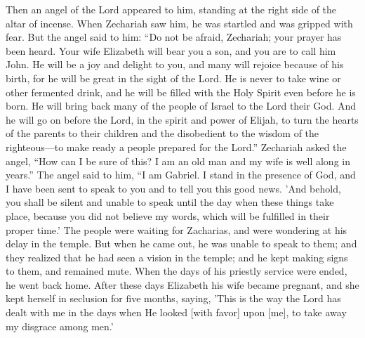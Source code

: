 \begin{scripture}[Luke 1:11-25]
    Then an angel of the Lord appeared to him, standing at the right side of the altar of incense.
    When Zechariah saw him, he was startled and was gripped with fear. 
    But the angel said to him: “Do not be afraid, Zechariah; your prayer has been heard. Your wife Elizabeth will bear you a son, and you are to call him John. 
    He will be a joy and delight to you, and many will rejoice because of his birth, 
    for he will be great in the sight of the Lord. He is never to take wine or other fermented drink, and he will be filled with the Holy Spirit even before he is born. 
    He will bring back many of the people of Israel to the Lord their God. 
    And he will go on before the Lord, in the spirit and power of Elijah, to turn the hearts of the parents to their children and the disobedient to the wisdom of the righteous—to make ready a people prepared for the Lord.”
    Zechariah asked the angel, “How can I be sure of this? I am an old man and my wife is well along in years.”
    The angel said to him, “I am Gabriel. I stand in the presence of God, and I have been sent to speak to you and to tell you this good news. 
    'And behold, you shall be silent and unable to speak until the day when these things take place, because you did not believe my words, which will be fulfilled in their proper time.'
    The people were waiting for Zacharias, and were wondering at his delay in the temple.
    But when he came out, he was unable to speak to them; and they realized that he had seen a vision in the temple; and he kept making signs to them, and remained mute.
    When the days of his priestly service were ended, he went back home.
    After these days Elizabeth his wife became pregnant, and she kept herself in seclusion for five months, saying,
    'This is the way the Lord has dealt with me in the days when He looked [with favor] upon [me], to take away my disgrace among men.'

\end{scripture}

\vspace{2\baselineskip}


